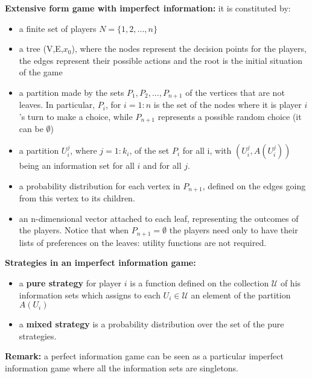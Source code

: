 \documentclass[pt11,a4paper,twoside,reqno,openright]{paper}
\begin{document}
\bigskip
\noindent \textbf{Extensive form game with imperfect information:} it is 
constituted by:
\begin{itemize}
	\item a finite set of players $N = \{1,2,...,n\}$
	\item a tree (V,E,$x_0$), where the nodes represent the decision points for 
	the players, the edges represent their possible actions and the root is the 
	initial situation of the game
	\item a partition made by the sets $P_1,P_2,...,P_{n+1}$ of the vertices 
	that are not leaves. In particular, $P_i$, for $i=1:n$ is the set of the 
	nodes where it is player $i$'s turn to make a choice, while $P_{n+1}$ 
	represents a possible random choice (it can be $\emptyset$)
	\item a partition $U_i^j$, where $j=1:k_i$, of the set $P_i$ for all i, 
	with $(U_i^j,A(U_i^j))$ being an information set for all $i$ and for all $j$.
	\item a probability distribution for each vertex in $P_{n+1}$, defined on 
	the edges going from this vertex to its children.
	\item an n-dimensional vector attached to each leaf, representing the 
	outcomes of the players. Notice that when $P_{n+1}=\emptyset$ the players 
	need only to have their lists of preferences on the leaves: utility 
	functions are not required.
\end{itemize}

\bigskip
\noindent \textbf{Strategies in an imperfect information game:}
\begin{itemize}
	\item a \textbf{pure strategy} for player $i$ is a function defined on the 
	collection $\mathcal{U}$ of his information sets which assigns to each 
	$U_i \in \mathcal{U}$ an element of the partition $A(U_i)$
	\item a \textbf{mixed strategy} is a probability distribution over the set 
	of the pure strategies.
\end{itemize}

\bigskip
\noindent \textbf{Remark:} a perfect information game can be seen as a 
particular imperfect information game where all the information sets are 
singletons.
\end{document}
